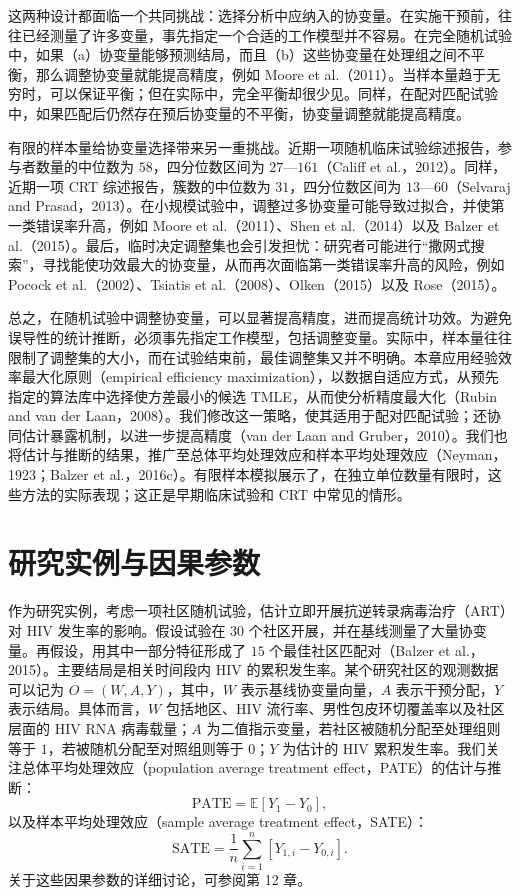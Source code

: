这两种设计都面临一个共同挑战：选择分析中应纳入的协变量。在实施干预前，往往已经测量了许多变量，事先指定一个合适的工作模型并不容易。在完全随机试验中，如果（a）协变量能够预测结局，而且（b）这些协变量在处理组之间不平衡，那么调整协变量就能提高精度，例如 Moore et al.（2011）。当样本量趋于无穷时，可以保证平衡；但在实际中，完全平衡却很少见。同样，在配对匹配试验中，如果匹配后仍然存在预后协变量的不平衡，协变量调整就能提高精度。

有限的样本量给协变量选择带来另一重挑战。近期一项随机临床试验综述报告，参与者数量的中位数为 $58$，四分位数区间为 $27$—$161$（Califf et al.，2012）。同样，近期一项 CRT 综述报告，簇数的中位数为 $31$，四分位数区间为 $13$—$60$（Selvaraj and Prasad，2013）。在小规模试验中，调整过多协变量可能导致过拟合，并使第一类错误率升高，例如 Moore et al.（2011）、Shen et al.（2014）以及 Balzer et al.（2015）。最后，临时决定调整集也会引发担忧：研究者可能进行“撒网式搜索”，寻找能使功效最大的协变量，从而再次面临第一类错误率升高的风险，例如 Pocock et al.（2002）、Tsiatis et al.（2008）、Olken（2015）以及 Rose（2015）。

总之，在随机试验中调整协变量，可以显著提高精度，进而提高统计功效。为避免误导性的统计推断，必须事先指定工作模型，包括调整变量。实际中，样本量往往限制了调整集的大小，而在试验结束前，最佳调整集又并不明确。本章应用经验效率最大化原则（empirical efficiency maximization），以数据自适应方式，从预先指定的算法库中选择使方差最小的候选 TMLE，从而使分析精度最大化（Rubin and van der Laan，2008）。我们修改这一策略，使其适用于配对匹配试验；还协同估计暴露机制，以进一步提高精度（van der Laan and Gruber，2010）。我们也将估计与推断的结果，推广至总体平均处理效应和样本平均处理效应（Neyman，1923；Balzer et al.，2016c）。有限样本模拟展示了，在独立单位数量有限时，这些方法的实际表现；这正是早期临床试验和 CRT 中常见的情形。

\section{研究实例与因果参数}
\label{sec:ch13-motivating-example}

作为研究实例，考虑一项社区随机试验，估计立即开展抗逆转录病毒治疗（ART）对 HIV 发生率的影响。假设试验在 $30$ 个社区开展，并在基线测量了大量协变量。再假设，用其中一部分特征形成了 $15$ 个最佳社区匹配对（Balzer et al.，2015）。主要结局是相关时间段内 HIV 的累积发生率。某个研究社区的观测数据可以记为 $O=(W,A,Y)$，其中，$W$ 表示基线协变量向量，$A$ 表示干预分配，$Y$ 表示结局。具体而言，$W$ 包括地区、HIV 流行率、男性包皮环切覆盖率以及社区层面的 HIV RNA 病毒载量；$A$ 为二值指示变量，若社区被随机分配至处理组则等于 $1$，若被随机分配至对照组则等于 $0$；$Y$ 为估计的 HIV 累积发生率。我们关注总体平均处理效应（population average treatment effect，PATE）的估计与推断：
\begin{equation}
 \mathrm{PATE}=\mathbb E[Y_1-Y_0],
 \tag{13.1}
\end{equation}
以及样本平均处理效应（sample average treatment effect，SATE）：
\begin{equation}
 \mathrm{SATE}=\frac1n\sum_{i=1}^n[Y_{1,i}-Y_{0,i}].
 \tag{13.2}
\end{equation}
关于这些因果参数的详细讨论，可参阅第 12 章。

